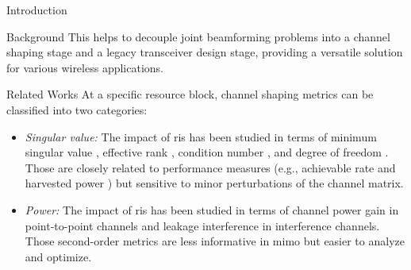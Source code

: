 \documentclass[journal]{IEEEtran}
\begin{document}
\begin{section}{Introduction}
\begin{subsection}{Background}
		This helps to decouple joint beamforming problems into a channel shaping stage and a legacy transceiver design stage, providing a versatile solution for various wireless applications.
	\end{subsection}

	\begin{subsection}{Related Works}
		At a specific resource block, channel shaping metrics can be classified into two categories:
		\begin{itemize}
			\item \emph{Singular value:} The impact of \gls{ris} has been studied in terms of minimum singular value \cite{ElMossallamy2021}, effective rank \cite{ElMossallamy2021,Meng2023}, condition number \cite{Zheng2022,Huang2023}, and degree of freedom \cite{Bafghi2022,Zheng2023,Chae2023}. Those are closely related to performance measures (e.g., achievable rate and harvested power \cite{Shen2021}) but sensitive to minor perturbations of the channel matrix.
			\item \emph{Power:} The impact of \gls{ris} has been studied in terms of channel power gain \cite{Wu2019,Shen2020a,Nerini2023,Nerini2024,Santamaria2023} in point-to-point channels and leakage interference \cite{Santamaria2023a} in interference channels. Those second-order metrics are less informative in \gls{mimo} but easier to analyze and optimize.
		\end{itemize}


\end{subsection}
\end{section}
\end{document}
